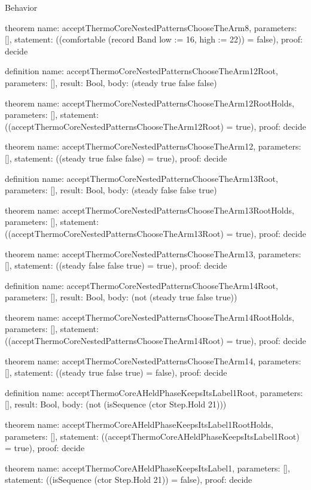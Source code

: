 \begin{lexlean}{Behavior}
\begin{semanticmodule}
theorem{
  name: acceptThermoCoreNestedPatternsChooseTheArm8,
  parameters: [],
  statement: ((comfortable (record Band {low := 16, high := 22})) = false),
  proof: decide{}
}

definition{
  name: acceptThermoCoreNestedPatternsChooseTheArm12Root,
  parameters: [],
  result: Bool,
  body: (steady true false false)
}

theorem{
  name: acceptThermoCoreNestedPatternsChooseTheArm12RootHolds,
  parameters: [],
  statement: ((acceptThermoCoreNestedPatternsChooseTheArm12Root) = true),
  proof: decide{}
}

theorem{
  name: acceptThermoCoreNestedPatternsChooseTheArm12,
  parameters: [],
  statement: ((steady true false false) = true),
  proof: decide{}
}

definition{
  name: acceptThermoCoreNestedPatternsChooseTheArm13Root,
  parameters: [],
  result: Bool,
  body: (steady false false true)
}

theorem{
  name: acceptThermoCoreNestedPatternsChooseTheArm13RootHolds,
  parameters: [],
  statement: ((acceptThermoCoreNestedPatternsChooseTheArm13Root) = true),
  proof: decide{}
}

theorem{
  name: acceptThermoCoreNestedPatternsChooseTheArm13,
  parameters: [],
  statement: ((steady false false true) = true),
  proof: decide{}
}

definition{
  name: acceptThermoCoreNestedPatternsChooseTheArm14Root,
  parameters: [],
  result: Bool,
  body: (not (steady true false true))
}

theorem{
  name: acceptThermoCoreNestedPatternsChooseTheArm14RootHolds,
  parameters: [],
  statement: ((acceptThermoCoreNestedPatternsChooseTheArm14Root) = true),
  proof: decide{}
}

theorem{
  name: acceptThermoCoreNestedPatternsChooseTheArm14,
  parameters: [],
  statement: ((steady true false true) = false),
  proof: decide{}
}

definition{
  name: acceptThermoCoreAHeldPhaseKeepsItsLabel1Root,
  parameters: [],
  result: Bool,
  body: (not (isSequence (ctor Step.Hold 21)))
}

theorem{
  name: acceptThermoCoreAHeldPhaseKeepsItsLabel1RootHolds,
  parameters: [],
  statement: ((acceptThermoCoreAHeldPhaseKeepsItsLabel1Root) = true),
  proof: decide{}
}

theorem{
  name: acceptThermoCoreAHeldPhaseKeepsItsLabel1,
  parameters: [],
  statement: ((isSequence (ctor Step.Hold 21)) = false),
  proof: decide{}
}


\end{semanticmodule}
\end{lexlean}
